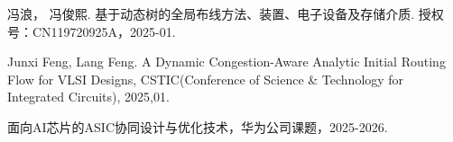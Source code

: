 
\begin{achievements}


\begin{theachievements}[发明专利]
  \item 冯浪， 冯俊熙. 基于动态树的全局布线方法、装置、电子设备及存储介质. 授权号：CN119720925A，2025-01.
\end{theachievements}

\begin{theachievements}[会议论文]
  \item Junxi Feng, Lang Feng. A Dynamic Congestion-Aware Analytic Initial Routing Flow for VLSI Designs, CSTIC(Conference of Science \& Technology for Integrated Circuits), 2025,01.
\end{theachievements}

\begin{theachievements}[参与的科研项目]
  \item 面向AI芯片的ASIC协同设计与优化技术，华为公司课题，2025-2026.
\end{theachievements}

\end{achievements}
